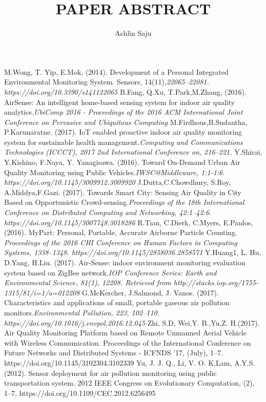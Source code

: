 \documentclass[11pt]{article}
\begin{document}
\title{PAPER ABSTRACT}
\author{Ashlin Saju}
\maketitle



\begin{thebibliography}{abc}
 M.Wong, T. Yip,  E.Mok, (2014). Development of a Personal Integrated Environmental Monitoring System. Sensors, 14(11),{\it 22065–22081. https://doi.org/10.3390/s141122065}
 B.Fang, Q.Xu, T.Park,M.Zhang, (2016). AirSense: An intelligent home-based sensing system for indoor air quality analytics.{\it UbiComp 2016 - Proceedings of the 2016 ACM International Joint Conference on Pervasive and Ubiquitous Computing}
 M.Firdhous,B.Sudantha,  P.Karunaratne. (2017). IoT enabled proactive indoor air quality monitoring system for sustainable health management.{\it Computing and Communications Technologies (ICCCT), 2017 2nd International Conference on, 216–221.}
 Y.Shirai, Y.Kishino, F.Naya, Y. Yanagisawa. (2016). Toward On-Demand Urban Air Quality Monitoring using Public Vehicles.{\it IWSC@Middleware, 1:1-1:6. https://doi.org/10.1145/3009912.3009920}
 J.Dutta,C.Chowdhury, S.Roy, A.Middya,F.Gazi. (2017). Towards Smart City: Sensing Air Quality in City Based on Opportunistic Crowd-sensing.{\it Proceedings of the 18th International Conference on Distributed Computing and Networking, 42:1--42:6. https://doi.org/10.1145/3007748.3018286}
 R.Tian, C.Dierk, C.Myers, E.Paulos, (2016). MyPart: Personal, Portable, Accurate Airborne Particle Counting. {\it Proceedings of the 2016 CHI Conference on Human Factors in Computing Systems, 1338–1348. https://doi.org/10.1145/2858036.2858571}
 Y.Huang1, L. Hu, D.Yang, H.Liu. (2017). Air-Sense: indoor environment monitoring evaluation system based on ZigBee network.{\it IOP Conference Series: Earth and Environmental Science, 81(1), 12208. Retrieved from http://stacks.iop.org/1755-1315/81/i=1/a=012208}
 G.McKercher, J.Salmond, J. Vanos. (2017). Characteristics and applications of small, portable gaseous air pollution monitors.{\it  Environmental Pollution, 223, 102–110. https://doi.org/10.1016/j.envpol.2016.12.045}
 Zhi, S.D, Wei,Y. B.,Yu,Z. H.(2017). Air Quality Monitoring Platform based on Remote Unmanned Aerial Vehicle with Wireless Communication. Proceedings of the International Conference on Future Networks and Distributed Systems  - ICFNDS ’17, (July), 1–7. https://doi.org/10.1145/3102304.3102339
 Yu, J. J. Q., Li, V. O. K,Lam, A.Y.S. (2012). Sensor deployment for air pollution monitoring using public transportation system. 2012 IEEE Congress on Evolutionary Computation, (2), 1–7. https://doi.org/10.1109/CEC.2012.6256495
\end{thebibliography}
\end{document}
